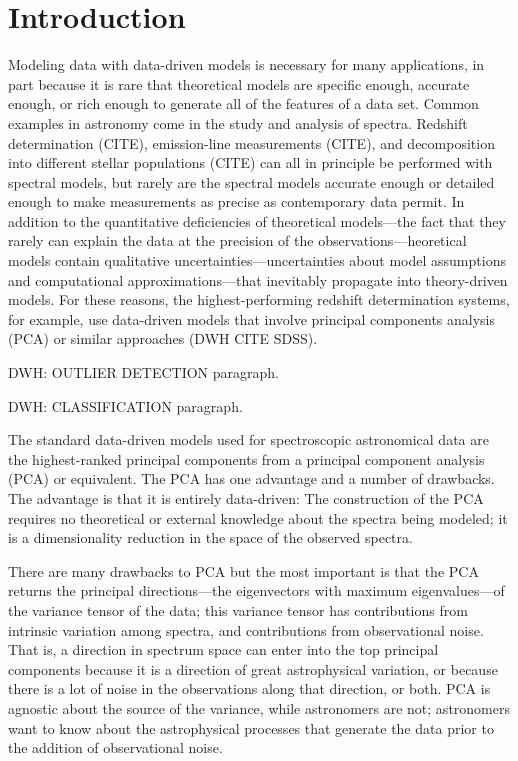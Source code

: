 \documentclass[apj]{emulateapj}
\begin{document}
\section{Introduction}\label{intro}
Modeling data with data-driven models is necessary for many
applications, in part because it is rare that theoretical models are
specific enough, accurate enough, or rich enough to generate all of
the features of a data set.  Common examples in astronomy come in the
study and analysis of spectra.  Redshift determination (CITE),
emission-line measurements (CITE), and decomposition into different
stellar populations (CITE) can all in principle be performed with
spectral models, but rarely are the spectral models accurate enough or
detailed enough to make measurements as precise as contemporary data
permit.  In addition to the quantitative deficiencies of theoretical
models---the fact that they rarely can explain the data at the
precision of the observations---heoretical models contain qualitative
uncertainties---uncertainties about model assumptions and
computational approximations---that inevitably propagate into
theory-driven models.  For these reasons, the highest-performing
redshift determination systems, for example, use data-driven models
that involve principal components analysis (PCA) or similar approaches
(DWH CITE SDSS).

DWH: OUTLIER DETECTION paragraph.

DWH: CLASSIFICATION paragraph.

The standard data-driven models used for spectroscopic astronomical
data are the highest-ranked principal components from a principal
component analysis (PCA) or equivalent. The PCA has one advantage and
a number of drawbacks.  The advantage is that it is entirely
data-driven: The construction of the PCA requires no theoretical or
external knowledge about the spectra being modeled; it is a
dimensionality reduction in the space of the observed spectra.

There are many drawbacks to PCA but the most important is that the PCA
returns the principal directions---the eigenvectors with maximum
eigenvalues---of the variance tensor of the data; this variance tensor
has contributions from intrinsic variation among spectra, and
contributions from observational noise.  That is, a direction in
spectrum space can enter into the top principal components because it
is a direction of great astrophysical variation, or because there is a
lot of noise in the observations along that direction, or both.  PCA
is agnostic about the source of the variance, while astronomers are
not; astronomers want to know about the astrophysical processes that
generate the data prior to the addition of observational noise.
\end{document}
